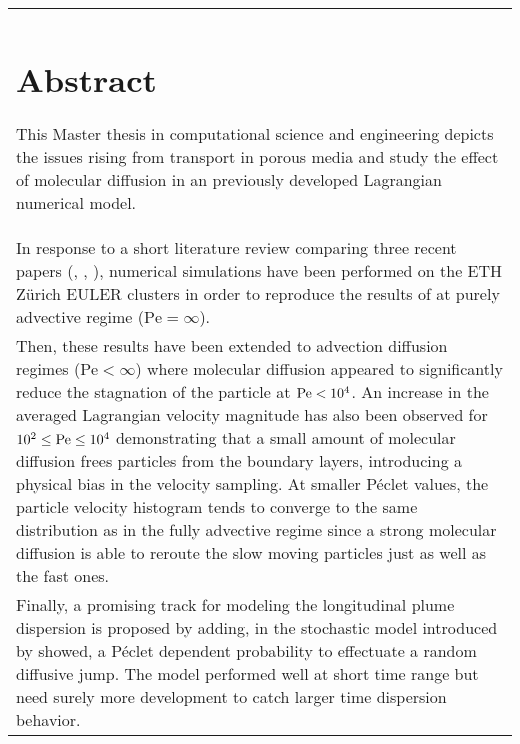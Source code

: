 \begin{tabular}{p{}}
\chapter*{Abstract}

This Master thesis in computational science and engineering depicts the issues rising from transport in porous media and study the effect of molecular diffusion in an previously developed Lagrangian numerical model. \\
In response to a short literature review comparing three recent papers (\citet{Puyguiraud2019}, \citet{Dentz2017}, \citet{Meyer2016}), numerical simulations have been performed on the ETH Zürich EULER clusters in order to reproduce the results of \citet{Meyer2016} at purely advective regime ($\mathrm{Pe}=\infty$).\\
Then, these results have been extended to advection diffusion regimes ($\mathrm{Pe}<\infty$) where molecular diffusion appeared to significantly reduce the stagnation of the particle at $\mathrm{Pe}<10^4$.
An increase in the averaged Lagrangian velocity magnitude has also been observed for $10^2\leq\mathrm{Pe}\leq10^4$ demonstrating that a small amount of molecular diffusion frees particles from the boundary layers, introducing a physical bias in the velocity sampling.
At smaller Péclet values, the particle velocity histogram tends to converge to the same distribution as in the fully advective regime since a strong molecular diffusion is able to reroute the slow moving particles just as well as the fast ones.\\
Finally, a promising track for modeling the longitudinal plume dispersion is proposed by adding, in the stochastic model introduced by \citet{Meyer2016} showed, a Péclet dependent probability to effectuate a random diffusive jump. 
The model performed well at short time range but need surely more development to catch larger time dispersion behavior.
\end{tabular}
